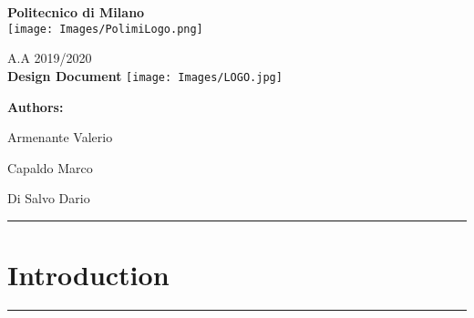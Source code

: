 \documentclass[12pt]{article}
\begin{document}
\onehalfspacing
\begin{center}
	{\huge {\textbf{Politecnico di Milano}}}
	 	\vspace{7mm}\\
	 	
 	 	\texttt{[image: Images/PolimiLogo.png]}
	\end{center}

\begin{center}
	     \vspace{5mm}
		{\Large A.A 2019/2020} 
		\vspace{1cm}\\
		{\Large {\textbf{Design Document}}}   
		\texttt{[image: Images/LOGO.jpg]}
    \end{center}
          
\begin{flushright}
         
	 	 
	 	{\huge {\Large \textbf{Authors:}}}
	 	 
	 	{Armenante Valerio}
	 	
	 	{Capaldo Marco}
	 	
	 	{Di Salvo Dario}
	\end{flushright}



\newpage
\hrule
\hypersetup{hidelinks}\tableofcontents

\vspace{0.5mm}
\vspace{0.24mm}

\newpage

\section{Introduction}
\hrule
\vspace{1cm}
\end{document}
